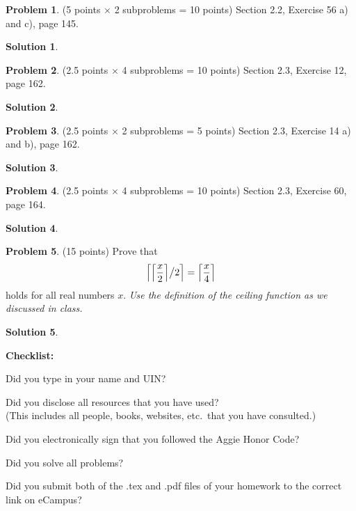 \documentclass{article}
\theoremstyle{definition}
\newtheorem{problem}{Problem}
\newtheorem*{solution}{Solution}
\newcommand{\checklist}{\noindent\textbf{Checklist:}
\begin{compactitem}[$\Box$] 
\item Did you type in your name and UIN? 
\item Did you disclose all resources that you have used? \\
(This includes all people, books, websites, etc.\ that you have consulted.)
\item Did you electronically sign that you followed the Aggie Honor Code? 
\item Did you solve all problems? 
\item Did you submit both of the .tex and .pdf files of your homework to the correct link on eCampus?
\end{compactitem}
}
\begin{document}
\begin{problem} (5 points $\times$ 2 subproblems = 10 points) 
Section 2.2, Exercise 56 a) and c), page 145. 
\end{problem}
\begin{solution}
\end{solution}

\begin{problem} (2.5 points $\times$ 4 subproblems = 10 points)
Section 2.3, Exercise 12, page 162. 
\end{problem}
\begin{solution}
\end{solution}

\begin{problem} (2.5 points $\times$ 2 subproblems = 5 points) 
Section 2.3, Exercise 14 a) and b), page 162.
\end{problem}
\begin{solution}
\end{solution}

\begin{problem} (2.5 points $\times$ 4 subproblems = 10 points) 
Section 2.3, Exercise 60, page 164. 
\end{problem}
\begin{solution}
\end{solution}

\begin{problem} (15 points) Prove that 
$$ \left\lceil {\left\lceil \displaystyle\frac{x}{2} \right\rceil} \big{/} {2} \right\rceil = 
\left\lceil \displaystyle\frac{x}{4} \right\rceil$$ holds for all real numbers $x$.
\textit{Use the definition of the ceiling function as we discussed in class.}
\end{problem}
\begin{solution}
\end{solution}
\bigskip

\goodbreak
\checklist
\end{document}
